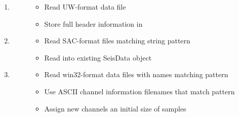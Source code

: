 \documentclass[letterpaper,11pt,english]{sphinxmanual}
\begin{document}
\label{\detokenize{src/Formats/fileformats:examples}}\begin{enumerate}
\def\theenumi{\arabic{enumi}}
\def\labelenumi{\theenumi .}
\makeatletter\def\p@enumii{\p@enumi \theenumi .}\makeatother
\item {} \begin{description}
\item[{}] \leavevmode\begin{itemize}
\item {} 
Read UW-format data file 

\item {} 
Store full header information in 

\end{itemize}

\end{description}

\item {} \begin{description}
\item[{}] \leavevmode\begin{itemize}
\item {} 
Read SAC-format files matching string pattern 

\item {} 
Read into existing SeisData object 

\end{itemize}

\end{description}

\item {} \begin{description}
\item[{}] \leavevmode\begin{itemize}
\item {} 
Read win32-format data files with names matching pattern 

\item {} 
Use ASCII channel information filenames that match pattern 

\item {} 
Assign new channels an initial size of  samples

\end{itemize}

\end{description}

\end{enumerate}
\end{document}
